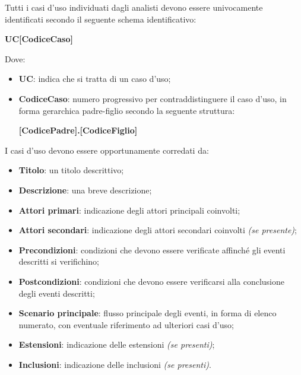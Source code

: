 Tutti i casi d'uso individuati dagli analisti devono essere univocamente identificati secondo il seguente schema identificativo:

\begin{center}
    \textbf{UC[CodiceCaso]}
\end{center}

Dove:

\begin{itemize}
    \item \textbf{UC}: indica che si tratta di un caso d'uso;
    \item \textbf{CodiceCaso}: numero progressivo per contraddistinguere il caso d'uso, in forma gerarchica padre-figlio secondo la seguente struttura:
    \begin{center}
        \textbf{[CodicePadre].[CodiceFiglio]}
    \end{center}
\end{itemize}

I casi d'uso devono essere opportunamente corredati da:

\begin{itemize}
    \item \textbf{Titolo}: un titolo descrittivo;
    \item \textbf{Descrizione}: una breve descrizione;
    \item \textbf{Attori primari}: indicazione degli attori principali coinvolti;
    \item \textbf{Attori secondari}: indicazione degli attori secondari coinvolti \emph{(se presente)};
    \item \textbf{Precondizioni}: condizioni che devono essere verificate affinch\'{e} gli eventi descritti si verifichino;
    \item \textbf{Postcondizioni}: condizioni che devono essere verificarsi alla conclusione degli eventi descritti; 
    \item \textbf{Scenario principale}: flusso principale degli eventi, in forma di elenco numerato, con eventuale riferimento ad ulteriori casi d'uso;
    \item \textbf{Estensioni}: indicazione delle estensioni \emph{(se presenti)};
    \item \textbf{Inclusioni}: indicazione delle inclusioni \emph{(se presenti)}.
\end{itemize}